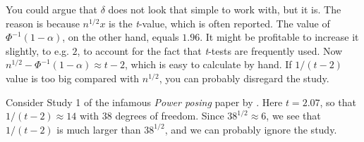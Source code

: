 You could argue that $\delta$ does not look that simple to work with, but it is. The reason is because $n^{1/2}x$ is the \textit{t}-value, which is often reported. The value of $\Phi^{-1}(1-\alpha)$, on the other hand, equals $1.96$. It might be profitable to increase it slightly, to e.g. $2$, to account for the fact that \textit{t}-tests are frequently used. Now $n^{1/2} - \Phi^{-1}(1-\alpha) \approx t - 2$, which is easy to calculate by hand. If $1/(t - 2)$ value is too big compared with $n^{1/2}$, you can probably disregard the study. 

Consider Study 1 of the infamous \emph{Power posing} paper by \textcite{Carney2010-we}. Here $t = 2.07$, so that $1/(t - 2) \approx 14$ with $38$ degrees of freedom. Since $38^{1/2} \approx 6$, we see that $1/(t - 2)$ is much larger than $38^{1/2}$, and we can probably ignore the study.

